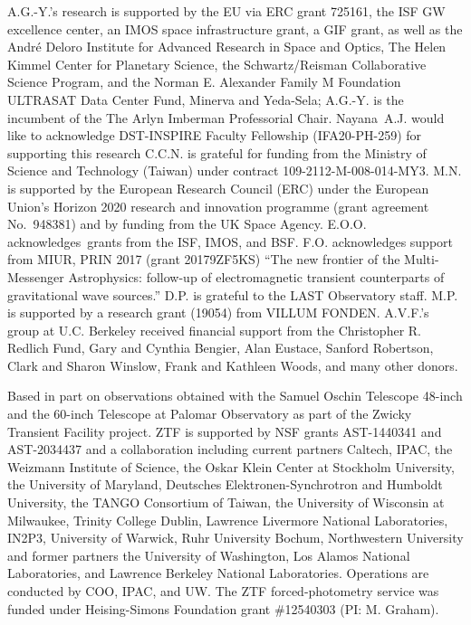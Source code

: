 \documentclass{nature_plusfigure}
\begin{document}
\begin{addendum}
A.G.-Y.’s research is supported by the EU via ERC grant 725161, the ISF GW excellence center, an IMOS space infrastructure grant, a GIF grant, as well as the André Deloro Institute for Advanced Research in Space and Optics, The Helen Kimmel Center for Planetary Science, the Schwartz/Reisman Collaborative Science Program, and the Norman E. Alexander Family M Foundation ULTRASAT Data Center Fund, Minerva and Yeda-Sela;  A.G.-Y. is the incumbent of the The Arlyn Imberman Professorial Chair.
Nayana A.J. would like to acknowledge DST-INSPIRE Faculty Fellowship (IFA20-PH-259) for supporting this research
C.C.N. is grateful for funding from the Ministry of Science and Technology (Taiwan) under contract 109-2112-M-008-014-MY3.
M.N. is supported by the European Research Council (ERC) under the European Union’s Horizon 2020 research and innovation programme (grant agreement No.~948381) and by funding from the UK Space Agency.
E.O.O. acknowledges grants from the ISF, IMOS, and BSF.
F.O. acknowledges support from MIUR, PRIN 2017 (grant 20179ZF5KS) ``The new frontier of the Multi-Messenger Astrophysics: follow-up of electromagnetic transient counterparts of gravitational wave sources.''
D.P. is grateful to the LAST Observatory staff.
M.P. is supported by a research grant (19054) from VILLUM FONDEN.
A.V.F.'s group at U.C. Berkeley received financial support from the Christopher R. Redlich Fund, Gary and Cynthia Bengier, Alan Eustace, Sanford Robertson, Clark and Sharon Winslow, Frank and Kathleen Woods, and many other donors.


Based in part on observations obtained with the Samuel Oschin Telescope 48-inch and the 60-inch Telescope at Palomar Observatory as part of the Zwicky Transient Facility project. ZTF is supported by NSF grants AST-1440341 and AST-2034437 and a collaboration including current partners Caltech, IPAC, the Weizmann Institute of Science, the Oskar Klein Center at Stockholm University, the University of Maryland, Deutsches Elektronen-Synchrotron and Humboldt University, the TANGO Consortium of Taiwan, the University of Wisconsin at Milwaukee, Trinity College Dublin, Lawrence Livermore National Laboratories, IN2P3, University of Warwick, Ruhr University Bochum, Northwestern University and former partners the University of Washington, Los Alamos National Laboratories, and Lawrence Berkeley National Laboratories. Operations are conducted by COO, IPAC, and UW.
The ZTF forced-photometry service was funded under Heising-Simons Foundation grant \#12540303 (PI: M. Graham).


\end{addendum}
\end{document}

